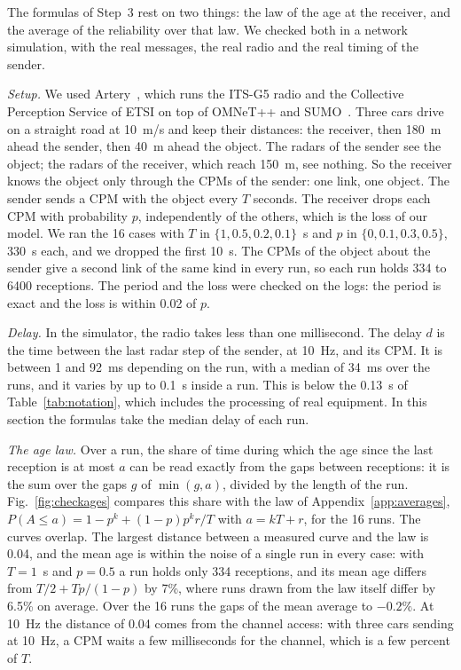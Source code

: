 \documentclass[conference]{IEEEtran}
\begin{document}
The formulas of Step~3 rest on two things: the law of the age at the
receiver, and the average of the reliability over that law. We checked both
in a network simulation, with the real messages, the real radio and the
real timing of the sender.

\emph{Setup.} We used Artery~\cite{riebl2015}, which runs the ITS-G5 radio
and the Collective Perception Service of ETSI on top of OMNeT++ and
SUMO~\cite{lopez2018}. Three cars drive on a straight road at 10~m/s and
keep their distances: the receiver, then 180~m ahead the sender, then 40~m
ahead the object. The radars of the sender see the object; the radars of the
receiver, which reach 150~m, see nothing. So the receiver knows the object
only through the CPMs of the sender: one link, one object. The sender sends
a CPM with the object every $T$ seconds. The receiver drops each CPM with
probability $p$, independently of the others, which is the loss of our
model. We ran the 16 cases with $T$ in $\{1, 0.5, 0.2, 0.1\}$~s and $p$ in
$\{0, 0.1, 0.3, 0.5\}$, 330~s each, and we dropped the first 10~s. The CPMs
of the object about the sender give a second link of the same kind in every
run, so each run holds 334 to 6400 receptions. The period and the loss were
checked on the logs: the period is exact and the loss is within 0.02 of $p$.

\emph{Delay.} In the simulator, the radio takes less than one millisecond.
The delay $d$ is the time between the last radar step of the sender, at
10~Hz, and its CPM. It is between 1 and 92~ms depending on the run, with a
median of 34~ms over the runs, and it varies by up to 0.1~s inside a run. This
is below the 0.13~s of Table~\ref{tab:notation}, which includes the
processing of real equipment. In this section the formulas take the median
delay of each run.

\emph{The age law.} Over a run, the share of time during which the age since
the last reception is at most $a$ can be read exactly from the gaps between
receptions: it is the sum over the gaps $g$ of $\min(g,a)$, divided by the
length of the run. Fig.~\ref{fig:checkages} compares this share with the law
of Appendix~\ref{app:averages}, $P(A\le a)=1-p^k+(1-p)p^k r/T$ with
$a=kT+r$, for the 16 runs. The curves overlap. The largest distance between a
measured curve and the law is 0.04, and the mean age is within the noise of a
single run in every case: with $T=1$~s and $p=0.5$ a run holds only 334
receptions, and its mean age differs from $T/2+Tp/(1-p)$ by 7\%, where runs
drawn from the law itself differ by 6.5\% on average. Over the 16 runs the
gaps of the mean average to $-0.2\%$. At 10~Hz the distance of 0.04 comes from
the channel access: with three cars sending at 10~Hz, a CPM waits a few
milliseconds for the channel, which is a few percent of $T$.
\end{document}
